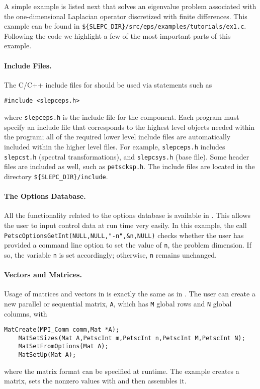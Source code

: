 	A simple example is listed next that solves an eigenvalue problem associated with the one-dimensional Laplacian operator discretized with finite differences. This example can be found in \Verb!${SLEPC_DIR}/src/eps/examples/tutorials/ex1.c!. Following the code we highlight a few of the most important parts of this example.


\paragraph{Include Files.}

The C/C++ include files for \slepc should be used via statements such as
	\begin{Verbatim}[fontsize=\small]
	#include <slepceps.h>
	\end{Verbatim}
where \Verb!slepceps.h! is the include file for the  component. Each \slepc program must specify an include file that corresponds to the highest level \slepc objects needed within the program; all of the required lower level include files are automatically included within the higher level files. For example, \Verb!slepceps.h! includes \Verb!slepcst.h! (spectral transformations), and \Verb!slepcsys.h! (base \slepc file). Some \petsc header files are included as well, such as \Verb!petscksp.h!. The \slepc include files are located in the directory \Verb!${SLEPC_DIR}/include!.

\paragraph{The Options Database.}

All the \petsc functionality related to the options database is available in \slepc. This allows the user to input control data at run time very easily. In this example, the call \Verb!PetscOptionsGetInt(NULL,NULL,"-n",&n,NULL)! checks whether the user has provided a command line option to set the value of \Verb!n!, the problem dimension.  If so, the variable \Verb!n! is set accordingly; otherwise, \Verb!n! remains unchanged.

\paragraph{Vectors and Matrices.}

Usage of matrices and vectors in \slepc is exactly the same as in \petsc. The user can create a new parallel or sequential matrix, \texttt{A}, which has \texttt{M} global rows and \texttt{N} global columns, with
	\begin{Verbatim}[fontsize=\small]
	MatCreate(MPI_Comm comm,Mat *A);
	MatSetSizes(Mat A,PetscInt m,PetscInt n,PetscInt M,PetscInt N);
	MatSetFromOptions(Mat A);
	MatSetUp(Mat A);
	\end{Verbatim}
where the matrix format can be specified at runtime. The example creates a matrix, sets the nonzero values with  and then assembles it.

